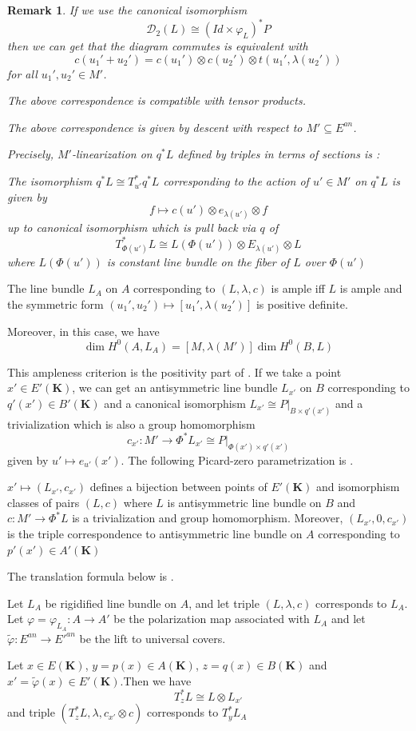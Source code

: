 \documentclass[10pt,a4paper]{amsart}
\theoremstyle{plain}
\newtheorem{remark}[theorem]{Remark}
\theoremstyle{plain}
\numberwithin{equation}{section}
\begin{document}
\begin{remark}
	If we use the canonical isomorphism 
	$$\mathscr{D}_2(L)\cong (Id\times \varphi_L)^*P$$ 
	then we can get that the diagram commutes is equivalent with 
	$$c(u_1'+u_2')=c(u_1')\otimes c(u_2')\otimes t(u_1',\lambda(u_2'))$$
	for all $u_1',u_2'\in M'$.
	
	
	The above correspondence is compatible with tensor products.
	
	
	The above correspondence is given by descent with respect to $M'\subseteq E^{an}$. 
	
	
	Precisely, $M'$-linearization on $q^*L$ defined by triples in terms of sections is :
	
	
	The isomorphism $q^*L\cong T^*_{u'}q^*L$ corresponding to the action of $u'\in M'$ on $q^*L$ is given by 
	$$f\mapsto c(u')\otimes e_{\lambda(u')}\otimes f$$
	up to canonical isomorphism which is pull back via $q$ of 
	$$T^*_{\Phi(u')}L\cong L(\Phi(u'))\otimes E_{\lambda(u')}\otimes L$$
	where $L(\Phi(u'))$ is constant line bundle on the fiber of $L$ over $\Phi(u')$
\end{remark}
\begin{prop}
	The line bundle $L_A$ on $A$ corresponding to $(L,\lambda,c)$ is ample iff $L$ is ample and the symmetric form $(u_1',u_2')\mapsto[u_1',\lambda(u_2')]$ is positive definite.
	
	
	Moreover, in this case, we have 
	$$\dim H^0(A,L_A)=[M,\lambda(M')]\dim H^0(B,L)$$
\end{prop} 
This ampleness criterion is the positivity part of
\cite[Theorem~3.6]{Ku1}.
If we take a point $x'\in E'(\mathbf{K})$, we can get an antisymmetric line bundle $L_{x'}$ on $B$ corresponding to $q'(x')\in B'(\mathbf{K})$ and a canonical isomorphism $L_{x'}\cong P|_{B\times q'(x')}$ and a trivialization which is also a group homomorphism 
$$c_{x'}:M'\to \Phi^*L_{x'}\cong P|_{\Phi(x')\times q'(x')}$$ given by 
$u'\mapsto e_{u'}(x')$.
The following Picard-zero parametrization is \cite[Proposition~3.8]{Ku1}.
\begin{cor}
	$x'\mapsto (L_{x'},c_{x'})$ defines a bijection between points of $E'(\mathbf{K})$ and isomorphism classes of pairs $(L,c)$ where $L$ is antisymmetric line bundle on $B$ and $c:M'\to \Phi^*L$ is a trivialization and group homomorphism. Moreover, $(L_{x'},0,c_{x'})$ is the triple correspondence to antisymmetric line bundle on $A$ corresponding to $p'(x')\in A'(\mathbf{K})$
\end{cor}
The translation formula below is \cite[Proposition~3.9]{Ku1}.
\begin{prop}
	Let $L_A$ be rigidified line bundle on $A$, and let triple $(L,\lambda,c)$ corresponds to $L_A$. Let $\varphi=\varphi_{L_A}:A\to A'$ be the polarization map associated with $L_A$ and let $\widetilde{\varphi}:E^{an}\to E'^{an}$ be the lift to universal covers.
	
	
	Let $x\in E(\mathbf{K})$, $y=p(x)\in A(\mathbf{K})$, $z=q(x)\in B(\mathbf{K})$ and $x'=\widetilde{\varphi}(x)\in E'(\mathbf{K})$.Then we have 
	$$T^*_zL\cong L\otimes L_{x'}$$
	and triple $(T^*_zL,\lambda,c_{x'}\otimes c)$ corresponds to $T^*_yL_A$
\end{prop}
\end{document}
